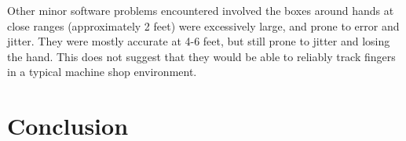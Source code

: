 \documentclass[12pt]{article}
\begin{document}
Other minor software problems encountered involved the boxes around hands at close ranges (approximately 2 feet) were excessively large, and prone to error and jitter. They were mostly accurate at 4-6 feet, but still prone to jitter and losing the hand. This does not suggest that they would be able to reliably track fingers in a typical machine shop environment.

\section{Conclusion}




\end{document}
